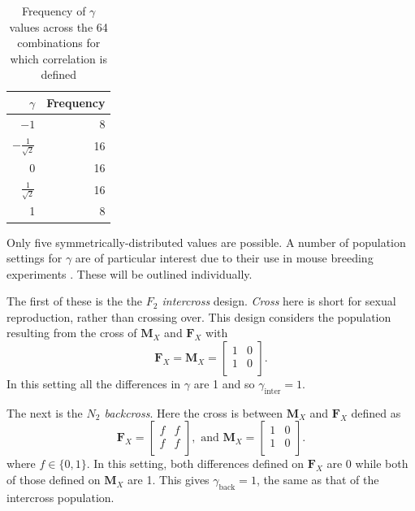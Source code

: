\documentclass[12pt]{article}
\newcommand{\m}[1]{\mathbf{#1}}               %
\begin{document}
\begin{table}[!h]
  \begin{center}
  \begin{tabular}{rr} \hline
    $\gamma$ & Frequency \\ \hline
    $-1$ & 8 \\
    $-\frac{1}{\sqrt{2}}$ & 16 \\
    0 & 16 \\
    $\frac{1}{\sqrt{2}}$ & 16 \\
    1 & 8 \\ \hline
  \end{tabular}
  \caption{Frequency of $\gamma$ values across the 64 combinations for which correlation is defined} \label{tab:gammaSum}
  \end{center}
\end{table}
Only five symmetrically-distributed values are possible. A number of population settings for $\gamma$ are of particular interest due to their use in mouse breeding experiments \cite{green1966}. These will be outlined individually.

The first of these is the the \textit{$F_2$ intercross} design. \emph{Cross} here is short for sexual reproduction, rather than crossing over. This design considers the population resulting from the cross of $\m{M}_X$ and $\m{F}_X$ with
$$\m{F}_X = \m{M}_X = \begin{bmatrix}
  1 & 0 \\
  1 & 0 \\
\end{bmatrix}.$$
In this setting all the differences in $\gamma$ are 1 and so $\gamma_{\text{inter}} = 1$.

The next is the \textit{$N_2$ backcross}. Here the cross is between $\m{M}_X$ and $\m{F}_X$ defined as
$$\m{F}_X = \begin{bmatrix}
  f & f \\
  f & f \\
\end{bmatrix}, \text{ and }
\m{M}_X = \begin{bmatrix}
  1 & 0 \\
  1 & 0 \\
\end{bmatrix}.$$
where $f \in \{0,1\}$. In this setting, both differences defined on $\m{F}_X$ are 0 while both of those defined on $\m{M}_X$ are 1. This gives $\gamma_{\text{back}} = 1$, the same as that of the intercross population.
\end{document}

